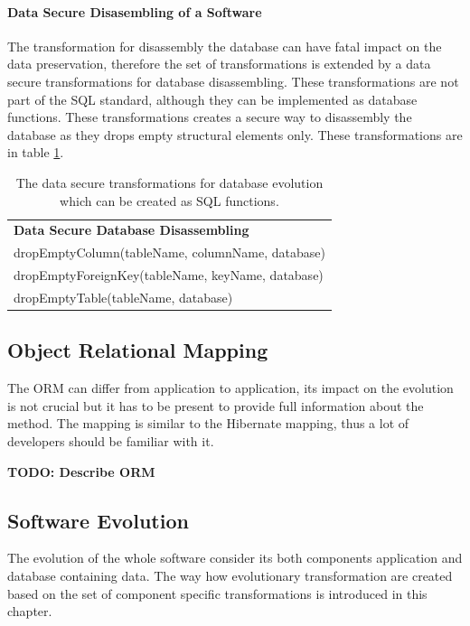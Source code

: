 \documentclass[11pt]{article}
\begin{document}
\paragraph{Data Secure Disasembling of a Software} The transformation for disassembly the database can have fatal impact on the data preservation, therefore the set of transformations is extended by a data secure transformations for database disassembling. These transformations are not part of the SQL standard, although they can be implemented as database functions. These transformations creates a secure way to disassembly the database as they drops empty structural elements only. These transformations are in table \ref{tab:db-adv-evolution}. 
\begin{table}
\centering
	\begin{tabular}{|l|}
	\hline
	\textbf{Data Secure Database Disassembling} \\
	dropEmptyColumn(tableName, columnName, database) \\
	dropEmptyForeignKey(tableName, keyName, database) \\
	dropEmptyTable(tableName, database) \\
	\hline
	\end{tabular}
	\caption{The data secure transformations for database evolution which can be created as SQL functions.}
	\label{tab:db-adv-evolution}
\end{table} 



\subsection{Object Relational Mapping}
The ORM can differ from application to application, its impact on the evolution is not crucial but it has to be present to provide full information about the method. The mapping is similar to the Hibernate
mapping, thus a lot of developers should be familiar with it. 

\textbf{TODO: Describe ORM}

\subsection{Software Evolution}
\label{sec:sw-evolution}
The evolution of the whole software consider its both components application and database containing data. The way how evolutionary transformation are created based on the set of component specific transformations is introduced in this chapter.
\end{document}
